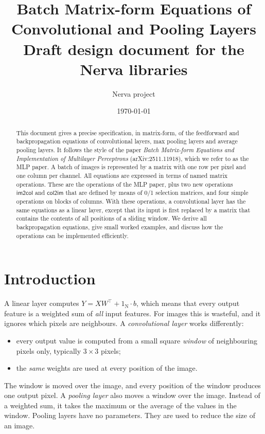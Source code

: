 \documentclass[twoside,11pt]{article}
\newcommand{\const}[1]{\ensuremath{\mathrm{#1}}} %
\newcommand{\func}[1]{\ensuremath{\textsf{#1}}}  %
\newcommand{\im}{\func{im2col}}
\newcommand{\ci}{\func{col2im}}
\begin{document}
\title{Batch Matrix-form Equations of\\ Convolutional and Pooling Layers\\[1ex] \large Draft design document for the Nerva libraries}
\author{Nerva project}
\date{\today}
\maketitle

\begin{abstract}
This document gives a precise specification, in matrix-form, of the feedforward and backpropagation equations of convolutional layers, max pooling layers and average pooling layers. It follows the style of the paper \emph{Batch Matrix-form Equations and Implementation of Multilayer Perceptrons} (arXiv:2511.11918), which we refer to as the MLP paper.
A batch of images is represented by a matrix with one row per pixel and one column per channel.
All equations are expressed in terms of named matrix operations. These are the operations of the MLP paper, plus two new operations \im{} and \ci{} that are defined by means of 0/1 selection matrices, and four simple operations on blocks of columns.
With these operations, a convolutional layer has the same equations as a linear layer, except that its input is first replaced by a matrix that contains the contents of all positions of a sliding window.
We derive all backpropagation equations, give small worked examples, and discuss how the operations can be implemented efficiently.
\end{abstract}

\tableofcontents

\section{Introduction}

A linear layer computes $Y = X W^\top + 1_\const{N} \cdot b$, which means that every output feature is a weighted sum of \emph{all} input features.
For images this is wasteful, and it ignores which pixels are neighbours.
A \emph{convolutional layer} works differently:
\begin{itemize}
\item every output value is computed from a small square \emph{window} of neighbouring pixels only, typically $3 \times 3$ pixels;
\item the \emph{same} weights are used at every position of the image.
\end{itemize}
The window is moved over the image, and every position of the window produces one output pixel.
A \emph{pooling layer} also moves a window over the image. Instead of a weighted sum, it takes the maximum or the average of the values in the window.
Pooling layers have no parameters. They are used to reduce the size of an image.
\end{document}

